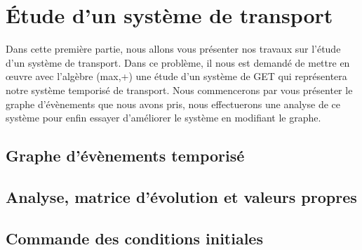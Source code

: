 \chapter{Étude d'un système de transport}
Dans cette première partie, nous allons vous présenter nos travaux sur l'étude d'un système de transport. Dans ce problème, il nous est demandé de mettre en œuvre avec l'algèbre (max,+) une étude d'un système de GET qui représentera notre système temporisé de transport. Nous commencerons par vous présenter le graphe d'évènements que nous avons pris, nous effectuerons une analyse de ce système pour enfin essayer d'améliorer le système en modifiant le graphe.

\section{Graphe d'évènements temporisé}

\section{Analyse, matrice d'évolution et valeurs propres}

\section{Commande des conditions initiales}


